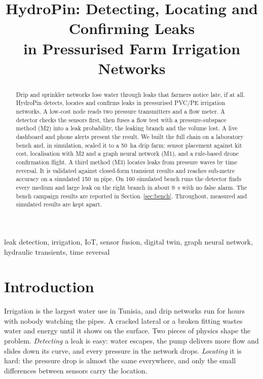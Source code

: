 \documentclass[conference]{IEEEtran}
\begin{document}
\title{HydroPin: Detecting, Locating and Confirming Leaks\\in Pressurised Farm Irrigation Networks}

\author{
}

\maketitle

\begin{abstract}
Drip and sprinkler networks lose water through leaks that farmers notice late, if at all.
HydroPin detects, locates and confirms leaks in pressurised PVC/PE irrigation networks. A low-cost
node reads two pressure transmitters and a flow meter. A detector checks the sensors first, then
fuses a flow test with a pressure-subspace method (M2) into a leak probability, the leaking
branch and the volume lost. A live dashboard and phone alerts present the result. We built the
full chain on a laboratory bench and, in simulation, scaled it to a 50~ha drip farm: sensor
placement against kit cost, localisation with M2 and a graph neural network (M1), and a
rule-based drone confirmation flight. A third method (M3) locates leaks from pressure waves by
time reversal. It is validated against closed-form transient results and reaches sub-metre
accuracy on a simulated 150~m pipe. On 160 simulated bench runs the detector finds every medium
and large leak on the right branch in about 9~s with no false alarm. The bench campaign results
are reported in Section~\ref{sec:bench}. Throughout, measured and simulated results are kept
apart.
\end{abstract}

\begin{IEEEkeywords}
leak detection, irrigation, IoT, sensor fusion, digital twin, graph neural network, hydraulic transients, time reversal
\end{IEEEkeywords}

\section{Introduction}
Irrigation is the largest water use in Tunisia, and drip networks run for hours with nobody
watching the pipes. A cracked lateral or a broken fitting wastes water and energy until it shows
on the surface. Two pieces of physics shape the problem. \emph{Detecting} a leak is easy: water
escapes, the pump delivers more flow and slides down its curve, and every pressure in the network
drops. \emph{Locating} it is hard: the pressure drop is almost the same everywhere, and only the
small differences between sensors carry the location.
\end{document}
